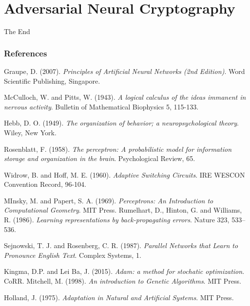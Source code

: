 \documentclass{beamer}
\begin{document}
\section{Adversarial Neural Cryptography}
\begin{frame}
\Huge{\centerline{The End}}
\end{frame}

\begin{frame}
\frametitle{References}
\begin{thebibliography}{99}
 {\sc Graupe, D.} (2007). \textit{Principles of Artificial Neural Networks (2nd Edition)}. Word Scientific Publishing, Singapore.
 
 {\sc McCulloch, W.} and {\sc Pitts, W}. (1943). \textit{A logical calculus of the ideas immanent in nervous activity}. Bulletin of Mathematical Biophysics 5, 115-133.

 {\sc Hebb, D. O.} (1949). \textit{The organization of behavior; a neuropsychological theory}. Wiley, New York.

 {\sc Rosenblatt, F.} (1958). \textit{The perceptron: A probabilistic model for information storage and organization in the brain}. Psychological Review, 65.

 {\sc Widrow, B.} and {\sc Hoff, M. E.} (1960). \textit{Adaptive Switching Circuits}. IRE WESCON Convention Record, 96-104.


\end{thebibliography}
\end{frame}
\begin{frame}
\begin{thebibliography}{99}
 {\sc MInsky, M.} and {\sc Papert, S. A.} (1969). \textit{Perceptrons: An Introduction to Computational Geometry}. MIT Press.
 {\sc Rumelhart, D.}, {\sc Hinton, G.} and {\sc Williams, R.} (1986). \textit{Learning representations by back-propagating errors}. Nature 323, 533–536.

 {\sc Sejnowski, T. J.} and {\sc Rosenberg, C. R.} (1987). \textit{Parallel Networks that Learn to Pronounce English Text}. Complex Systems, 1.

 {\sc Kingma, D.P.} and {\sc Lei Ba, J.} (2015). \textit{Adam: a method for stochatic optimization}. CoRR.
 {\sc Mitchell, M.} (1998). \textit{An introduction to Genetic Algorithms}. MIT Press.

 {\sc Holland, J.} (1975). \textit{Adaptation in Natural and Artificial Systems}. MIT Press. 
\end{thebibliography}
\end{frame}
\end{document}
